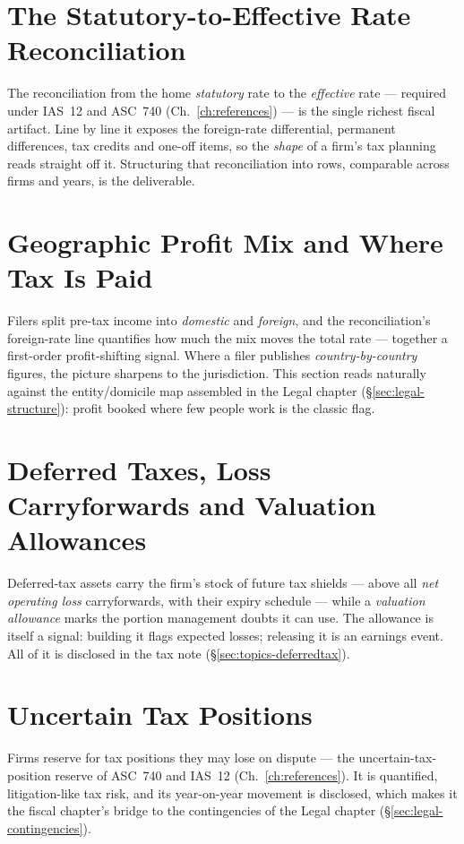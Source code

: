 \documentclass[11pt,a4paper]{report}
\begin{document}
\section{The Statutory-to-Effective Rate Reconciliation}
The reconciliation from the home \emph{statutory} rate to the \emph{effective} rate --- required under IAS~12
and ASC~740 (Ch.~\ref{ch:references}) --- is the single richest fiscal artifact. Line by line it exposes the
foreign-rate differential, permanent differences, tax credits and one-off items, so the \emph{shape} of a firm's
tax planning reads straight off it. Structuring that reconciliation into rows, comparable across firms and
years, is the deliverable.

\section{Geographic Profit Mix and Where Tax Is Paid}
\label{sec:fiscal-geography}
Filers split pre-tax income into \emph{domestic} and \emph{foreign}, and the reconciliation's foreign-rate line
quantifies how much the mix moves the total rate --- together a first-order profit-shifting signal. Where a
filer publishes \emph{country-by-country} figures, the picture sharpens to the jurisdiction. This section reads
naturally against the entity/domicile map assembled in the Legal chapter (\S\ref{sec:legal-structure}): profit
booked where few people work is the classic flag.

\section{Deferred Taxes, Loss Carryforwards and Valuation Allowances}
Deferred-tax assets carry the firm's stock of future tax shields --- above all \emph{net operating loss}
carryforwards, with their expiry schedule --- while a \emph{valuation allowance} marks the portion management
doubts it can use. The allowance is itself a signal: building it flags expected losses; releasing it is an
earnings event. All of it is disclosed in the tax note (\S\ref{sec:topics-deferredtax}).

\section{Uncertain Tax Positions}
\label{sec:fiscal-utp}
Firms reserve for tax positions they may lose on dispute --- the uncertain-tax-position reserve of ASC~740 and
IAS~12 (Ch.~\ref{ch:references}). It is quantified, litigation-like tax risk, and its year-on-year movement is
disclosed, which makes it the fiscal chapter's bridge to the contingencies of the Legal chapter
(\S\ref{sec:legal-contingencies}).
\end{document}
